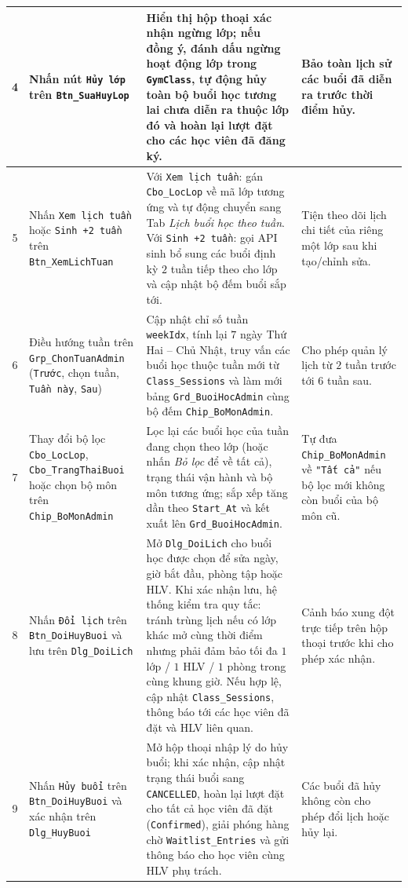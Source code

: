 \documentclass[a4paper,12pt]{article}
\begin{document}
{\begin{longtable}{|c|L{3.5cm}|L{7.8cm}|L{3.5cm}|}
4 & Nhấn nút \texttt{Hủy lớp} trên \texttt{Btn\_SuaHuyLop} &
Hiển thị hộp thoại xác nhận ngừng lớp; nếu đồng ý, đánh dấu ngừng hoạt động lớp trong \texttt{GymClass}, tự động hủy toàn bộ buổi học tương lai chưa diễn ra thuộc lớp đó và hoàn lại lượt đặt cho các học viên đã đăng ký. &
Bảo toàn lịch sử các buổi đã diễn ra trước thời điểm hủy. \\ \hline

5 & Nhấn \texttt{Xem lịch tuần} hoặc \texttt{Sinh +2 tuần} trên \texttt{Btn\_XemLichTuan} &
Với \texttt{Xem lịch tuần}: gán \texttt{Cbo\_LocLop} về mã lớp tương ứng và tự động chuyển sang Tab \textit{Lịch buổi học theo tuần}. Với \texttt{Sinh +2 tuần}: gọi API sinh bổ sung các buổi định kỳ $2$ tuần tiếp theo cho lớp và cập nhật bộ đếm buổi sắp tới. &
Tiện theo dõi lịch chi tiết của riêng một lớp sau khi tạo/chỉnh sửa. \\ \hline

6 & Điều hướng tuần trên \texttt{Grp\_ChonTuanAdmin} (\texttt{Trước}, chọn tuần, \texttt{Tuần này}, \texttt{Sau}) &
Cập nhật chỉ số tuần \texttt{weekIdx}, tính lại $7$ ngày Thứ Hai -- Chủ Nhật, truy vấn các buổi học thuộc tuần mới từ \texttt{Class\_Sessions} và làm mới bảng \texttt{Grd\_BuoiHocAdmin} cùng bộ đếm \texttt{Chip\_BoMonAdmin}. &
Cho phép quản lý lịch từ $2$ tuần trước tới $6$ tuần sau. \\ \hline

7 & Thay đổi bộ lọc \texttt{Cbo\_LocLop}, \texttt{Cbo\_TrangThaiBuoi} hoặc chọn bộ môn trên \texttt{Chip\_BoMonAdmin} &
Lọc lại các buổi học của tuần đang chọn theo lớp (hoặc nhấn \textit{Bỏ lọc} để về tất cả), trạng thái vận hành và bộ môn tương ứng; sắp xếp tăng dần theo \texttt{Start\_At} và kết xuất lên \texttt{Grd\_BuoiHocAdmin}. &
Tự đưa \texttt{Chip\_BoMonAdmin} về \texttt{"Tất cả"} nếu bộ lọc mới không còn buổi của bộ môn cũ. \\ \hline

8 & Nhấn \texttt{Đổi lịch} trên \texttt{Btn\_DoiHuyBuoi} và lưu trên \texttt{Dlg\_DoiLich} &
Mở \texttt{Dlg\_DoiLich} cho buổi học được chọn để sửa ngày, giờ bắt đầu, phòng tập hoặc HLV. Khi xác nhận lưu, hệ thống kiểm tra quy tắc: tránh trùng lịch nếu có lớp khác mở cùng thời điểm nhưng phải đảm bảo tối đa $1$ lớp / $1$ HLV / $1$ phòng trong cùng khung giờ. Nếu hợp lệ, cập nhật \texttt{Class\_Sessions}, thông báo tới các học viên đã đặt và HLV liên quan. &
Cảnh báo xung đột trực tiếp trên hộp thoại trước khi cho phép xác nhận. \\ \hline

9 & Nhấn \texttt{Hủy buổi} trên \texttt{Btn\_DoiHuyBuoi} và xác nhận trên \texttt{Dlg\_HuyBuoi} &
Mở hộp thoại nhập lý do hủy buổi; khi xác nhận, cập nhật trạng thái buổi sang \texttt{CANCELLED}, hoàn lại lượt đặt cho tất cả học viên đã đặt (\texttt{Confirmed}), giải phóng hàng chờ \texttt{Waitlist\_Entries} và gửi thông báo cho học viên cùng HLV phụ trách. &
Các buổi đã hủy không còn cho phép đổi lịch hoặc hủy lại. \\ \hline


\end{longtable}}
\end{document}
